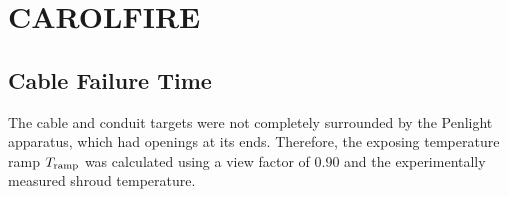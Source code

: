 \clearpage


\section{CAROLFIRE}

\subsection*{Cable Failure Time~\cite{CAROLFIRE}}

The cable and conduit targets were not completely surrounded by the Penlight apparatus, which had openings at its ends. Therefore, the exposing temperature ramp $T_{\rm ramp}$ was calculated using a view factor of 0.90 and the experimentally measured shroud temperature.

\begin{table}[!ht]
\caption[Validation input parameters for CAROLFIRE cases, cable failure time]
{Summary of validation input parameters used for CAROLFIRE cases~\cite{CAROLFIRE}, cable failure time.}


\end{table}
